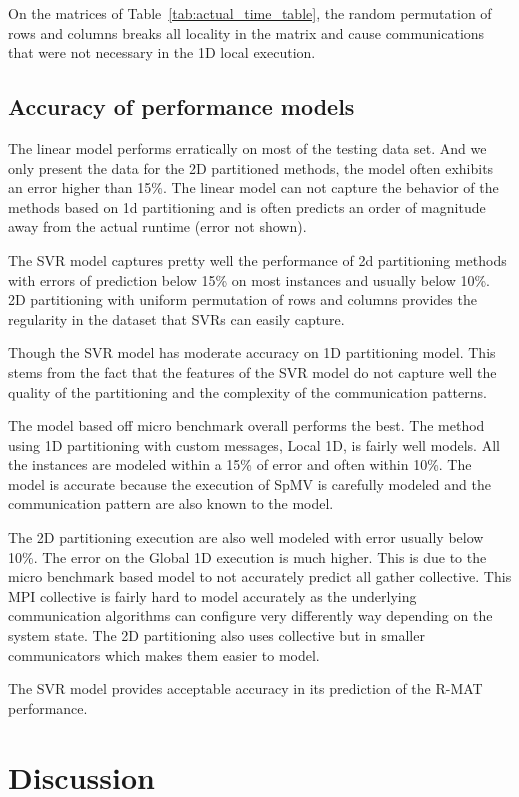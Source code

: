 \documentclass[sigconf,review,anonymous]{acmart}
\begin{document}
On the matrices of Table~\ref{tab:actual_time_table}, the random
permutation of rows and columns breaks all locality in the matrix and
cause communications that were not necessary in the 1D local
execution.

\subsection{Accuracy of performance models}

The linear model performs erratically on most of the testing data
set. And we only present the data for the 2D partitioned methods, the
model often exhibits an error higher than 15\%. The linear model can
not capture the behavior of the methods based on 1d partitioning and
is often predicts an order of magnitude away from the actual runtime
(error not shown).

The SVR model captures pretty well the performance of 2d partitioning
methods with errors of prediction below 15\% on most instances and
usually below 10\%. 2D partitioning with uniform permutation of rows
and columns provides the regularity in the dataset that SVRs can
easily capture.

Though the SVR model has moderate accuracy on 1D partitioning
model. This stems from the fact that the features of the SVR model do
not capture well the quality of the partitioning and the complexity of
the communication patterns.

The model based off micro benchmark overall performs the best. The
method using 1D partitioning with custom messages, Local 1D, is fairly
well models. All the instances are modeled within a 15\% of error and
often within 10\%. The model is accurate because the execution of SpMV
is carefully modeled and the communication pattern are also known to
the model.

The 2D partitioning execution are also well modeled with error usually
below 10\%. The error on the Global 1D execution is much higher. This
is due to the micro benchmark based model to not accurately predict
all gather collective. This MPI collective is fairly hard to model
accurately as the underlying communication algorithms can configure 
very differently way depending on the system state. The
2D partitioning also uses collective but in smaller communicators
which makes them easier to model.

The SVR model provides acceptable accuracy in its prediction of the
R-MAT performance.


\section{Discussion}
\end{document}
